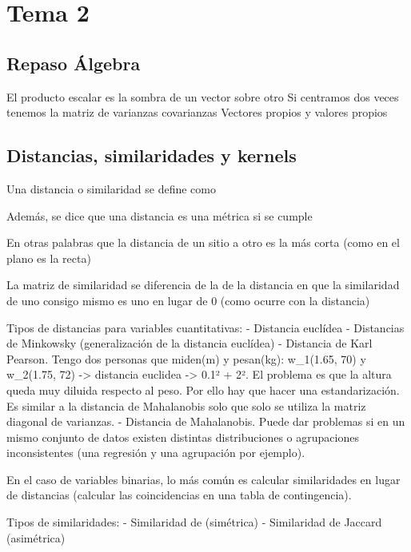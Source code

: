 \section{Tema 2}
\subsection{Repaso Álgebra}
El producto escalar es la sombra de un vector sobre otro
Si centramos dos veces tenemos la matriz de varianzas covarianzas
Vectores propios y valores propios

\subsection{Distancias, similaridades y kernels}
Una distancia o similaridad se define como

Además, se dice que una distancia es una métrica si se cumple

En otras palabras que la distancia de un sitio a otro es la más corta (como en el plano es la recta)

La matriz de similaridad se diferencia de la de la distancia en que la similaridad de uno consigo mismo es uno en lugar de 0 (como ocurre con la distancia)

Tipos de distancias para variables cuantitativas:
- Distancia euclídea
- Distancias de Minkowsky (generalización de la distancia euclídea)
- Distancia de Karl Pearson. Tengo dos personas que miden(m) y pesan(kg): w_1(1.65, 70) y w_2(1.75, 72) -> distancia euclidea -> 0.1² + 2². El problema es que la altura queda muy diluida respecto al peso. Por ello hay que hacer una estandarización. Es similar a la distancia de Mahalanobis solo que solo se utiliza la matriz diagonal de varianzas.
- Distancia de Mahalanobis. Puede dar problemas si en un mismo conjunto de datos existen  distintas distribuciones o agrupaciones inconsistentes (una regresión y una agrupación por ejemplo).


En el caso de variables binarias, lo más común es calcular similaridades en lugar de distancias (calcular las coincidencias en una tabla de contingencia).

Tipos de similaridades:
- Similaridad de (simétrica)
- Similaridad de Jaccard (asimétrica)


